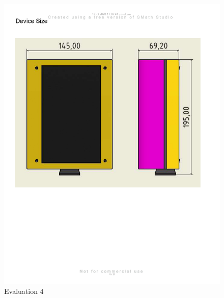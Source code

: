 \begin{figure}[H]
    \centering
    \includegraphics[width=\linewidth]{texs/appendix/data/evaluation/eval_page-0004.jpg}
    \caption{Evaluation 4}
    \label{fig:evaluation-4}
\end{figure}

